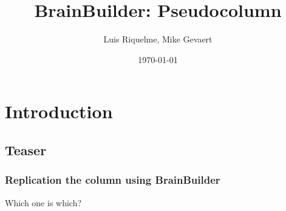 \documentclass{beamer}
\title{BrainBuilder: Pseudocolumn}
\author{Luis Riquelme, Mike Gevaert}
\institute{Human Brain Project}
\date{\today}
\begin{document}
\begin{frame}
  \titlepage
\end{frame}

\section{Introduction}
\subsection{Teaser}
\begin{frame}
  \frametitle{Replication the column using BrainBuilder}

  Which one is which?
  \begin{figure}[h]

\end{figure}
\end{frame}
\end{document}
